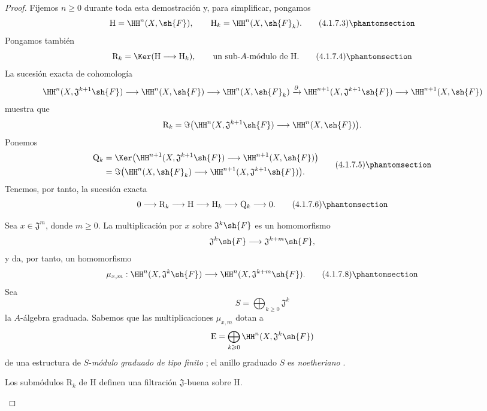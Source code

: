 \documentclass[oneside]{amsart}
\renewcommand{\geq}{\geqslant}
\let\EGAOriginalLabel\label
\renewcommand{\label}[1]{\phantomsection\EGAOriginalLabel{#1}}
\begin{document}
\begin{proof}
Fijemos $n\geq0$ durante toda esta demostración y, para simplificar,
pongamos
\[
  \mathrm{H}=\HH^n(X,\sh{F}),
  \qquad
  \mathrm{H}_k=\HH^n(X,\sh{F}_k).
  \tag{4.1.7.3}
  \label{III.4.1.7.3}
\]
Pongamos también
\[
  \mathrm{R}_k
  =
  \Ker(\mathrm{H}\longrightarrow\mathrm{H}_k),
  \qquad
  \text{un sub-$A$-módulo de $\mathrm{H}$.}
  \tag{4.1.7.4}
  \label{III.4.1.7.4}
\]
La sucesión exacta de cohomología
\[
  \HH^n(X,\mathfrak{J}^{k+1}\sh{F})
  \longrightarrow
  \HH^n(X,\sh{F})
  \longrightarrow
  \HH^n(X,\sh{F}_k)
  \xrightarrow{\partial}
  \HH^{n+1}(X,\mathfrak{J}^{k+1}\sh{F})
  \longrightarrow
  \HH^{n+1}(X,\sh{F})
\]
muestra que
\[
  \mathrm{R}_k
  =
  \Im\bigl(
    \HH^n(X,\mathfrak{J}^{k+1}\sh{F})
    \longrightarrow
    \HH^n(X,\sh{F})
  \bigr).
\]
Ponemos
\[
  \begin{split}
  \mathrm{Q}_k
  &=
  \Ker\bigl(
    \HH^{n+1}(X,\mathfrak{J}^{k+1}\sh{F})
    \longrightarrow
    \HH^{n+1}(X,\sh{F})
  \bigr)
  \\
  &=
  \Im\bigl(
    \HH^n(X,\sh{F}_k)
    \longrightarrow
    \HH^{n+1}(X,\mathfrak{J}^{k+1}\sh{F})
  \bigr).
  \end{split}
  \tag{4.1.7.5}
  \label{III.4.1.7.5}
\]
Tenemos, por tanto, la sucesión exacta
\[
  0\longrightarrow\mathrm{R}_k
  \longrightarrow\mathrm{H}
  \longrightarrow\mathrm{H}_k
  \longrightarrow\mathrm{Q}_k
  \longrightarrow0.
  \tag{4.1.7.6}
  \label{III.4.1.7.6}
\]

\begin{env}[4.1.7.7]
\label{III.4.1.7.7}
Sea $x\in\mathfrak{J}^m$, donde $m\geq0$.
La multiplicación por $x$ sobre $\mathfrak{J}^k\sh{F}$ es un
homomorfismo
\[
  \mathfrak{J}^k\sh{F}
  \longrightarrow
  \mathfrak{J}^{k+m}\sh{F},
\]
y da, por tanto, un homomorfismo
\[
  \mu_{x,m}:
  \HH^n(X,\mathfrak{J}^k\sh{F})
  \longrightarrow
  \HH^n(X,\mathfrak{J}^{k+m}\sh{F}).
  \tag{4.1.7.8}
  \label{III.4.1.7.8}
\]
Sea
\[
  S=\bigoplus_{k\geq0}\mathfrak{J}^k
\]
la $A$-álgebra graduada.
Sabemos que las multiplicaciones $\mu_{x,m}$ dotan a
\[
  \mathrm{E}
  =
  \bigoplus_{k\geq0}
  \HH^n(X,\mathfrak{J}^k\sh{F})
\]
de una estructura de $S$-\emph{módulo graduado de tipo finito}
; el anillo graduado $S$ es \emph{noetheriano}
.
\end{env}

\begin{lemma}[4.1.7.9]
\label{III.4.1.7.9}
Los submódulos $\mathrm{R}_k$ de $\mathrm{H}$ definen una
filtración $\mathfrak{J}$-buena sobre $\mathrm{H}$.
\end{lemma}


\end{proof}
\end{document}

